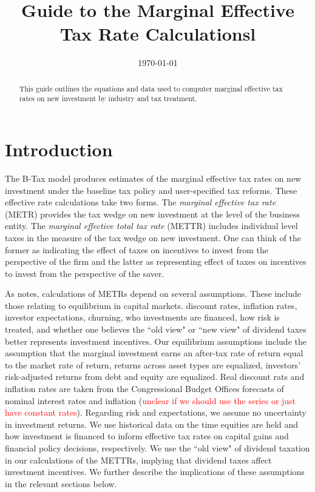 \documentclass[article,11pt,letterpaper,fleqn]{article}
\title{Guide to the Marginal Effective Tax Rate Calculationsl}
\date{\today}
\theoremstyle{definition}
\numberwithin{equation}{section}
\newcommand{\cn}{\citeasnoun} %
\begin{document}

\maketitle



\begin{abstract}
This guide outlines the equations and data used to computer marginal effective tax rates on new investment by industry and tax treatment.
\end{abstract}

\section{Introduction}

The B-Tax model produces estimates of the marginal effective tax rates on new investment under the baseline tax policy and user-specified tax reforms.  These effective rate calculations take two forms.  The \emph{marginal effective tax rate} (METR) provides the tax wedge on new investment at the level of the business entity.  The \emph{marginal effective total tax rate} (METTR) includes individual level taxes in the measure of the tax wedge on new investment.  One can think of the former as indicating the effect of taxes on incentives to invest from the perspective of the firm and the latter as representing effect of taxes on incentives to invest from the perspective of the saver.

As \cn{FullertonMETR} notes, calculations of METRs depend on several assumptions.  These include those relating to equilibrium in capital markets. discount rates, inflation rates, investor expectations, churning, who investments are financed, how risk is treated, and whether one believes the ``old view" or ``new view" of dividend taxes better represents investment incentives.  Our equilibrium assumptions include the assumption that the marginal investment earns an after-tax rate of return equal to the market rate of return, returns across asset types are equalized, investors' risk-adjusted returns from debt and equity are equalized.  Real discount rats and inflation rates are taken from the Congressional Budget Offices forecasts of nominal interest rates and inflation (\textcolor{red}{unclear if we should use the series or just have constant rates}).  Regarding risk and expectations, we assume no uncertainty in investment returns.  We use historical data on the time equities are held and how investment is financed to inform effective tax rates on capital gains and financial policy decisions, respectively.  We use the ``old view" of dividend taxation in our calculations of the METTRs, implying that dividend taxes affect investment incentives.  We further describe the implications of these assumptions in the relevant sections below.
\end{document}
